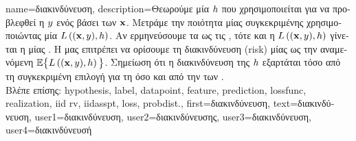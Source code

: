 {name={\foreignlanguage{greek}{διακινδύνευση}},
	description={\foreignlanguage{greek}{Θεωρούμε μία} 
		 $h$ \foreignlanguage{greek}{που χρησιμοποιείται για να προβλεφθεί η}  
		$y$ \foreignlanguage{greek}{ενός}  \foreignlanguage{greek}{βάσει των}  
		${\bf x}$. \foreignlanguage{greek}{Μετράμε την ποιότητα μίας συγκεκριμένης}  
		\foreignlanguage{greek}{χρησιμοποιώντας μία}  $L\left(({\bf x},y),h \right)$. 
		\foreignlanguage{greek}{Αν ερμηνεύσουμε τα}  \foreignlanguage{greek}{ως τις}  
		 , \foreignlanguage{greek}{τότε και η $L\left(({\bf x},y),h \right)$ γίνεται η} 
		 \foreignlanguage{greek}{μίας} . \foreignlanguage{greek}{Η}  
		\foreignlanguage{greek}{μας επιτρέπει να ορίσουμε τη διακινδύνευση} (risk) \foreignlanguage{greek}{μίας}  
		\foreignlanguage{greek}{ως την αναμενόμενη}  $\mathbb{E} \big\{L\left(({\bf x},y),h \right) \big\}$. 
		\foreignlanguage{greek}{Σημείωση ότι η διακινδύνευση της $h$ εξαρτάται τόσο από τη συγκεκριμένη επιλογή 
		για τη}  \foreignlanguage{greek}{όσο και από την}  
		\foreignlanguage{greek}{των} .
		\\
		\foreignlanguage{greek}{Βλέπε επίσης:} \gls{hypothesis}, \gls{label}, \gls{datapoint}, \gls{feature}, \gls{prediction}, \gls{lossfunc}, 
		\gls{realization}, \gls{iid} \gls{rv}, \gls{iidasspt}, \gls{loss}, \gls{probdist}.},
	first={\foreignlanguage{greek}{διακινδύνευση}},
	text={\foreignlanguage{greek}{διακινδύνευση}},
	user1={\foreignlanguage{greek}{διακινδύνευση}}, %
    	user2={\foreignlanguage{greek}{διακινδύνευσης}}, %
	user3={\foreignlanguage{greek}{διακινδύνευση}}, %
	user4={\foreignlanguage{greek}{διακινδύνευσή}} %
}

